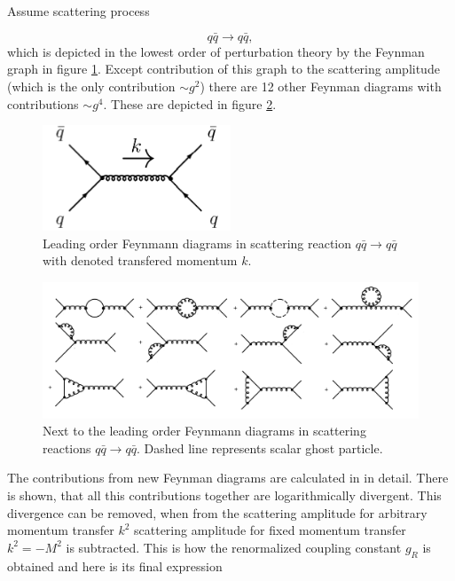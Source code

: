\documentclass[a4paper,11pt]{report}
\begin{document}
Assume scattering process  

\begin{equation}
  q \bar{q} \rightarrow q \bar{q},
  \label{eq:QuarkScattering}
\end{equation}
which is depicted in the lowest order of perturbation theory by the Feynman
graph in figure \ref{fig:QuarkQuarkScattering}. Except contribution of this
graph to the scattering amplitude (which is the only contribution $\sim g^2$)
there are 12 other Feynman diagrams with contributions $\sim g^4$. These are
depicted in figure \ref{fig:QuarkQuarkScatteringCorrection}. 

\begin{figure}[t]
  \centering
  \includegraphics[width=0.5\textwidth]{Chapter1/QuarkQuarkScattering.png} 
  \caption{Leading order Feynmann diagrams in scattering reaction $q \bar{q}
    \rightarrow q \bar{q}$ with denoted transfered momentum $k$.}
  \label{fig:QuarkQuarkScattering}
\end{figure}

\begin{figure}[t]
  \centering
  \includegraphics[width=\textwidth]{Chapter1/QuarkQuarkCorrection.png} 
  \caption{Next to the leading order Feynmann diagrams in scattering reactions
    $q \bar{q} \rightarrow q \bar{q}$. Dashed line represents scalar ghost
  particle.}
  \label{fig:QuarkQuarkScatteringCorrection}
\end{figure}

The contributions from new Feynman diagrams are calculated in \cite{QCDTextbook}
in detail. There is shown, that all this contributions together are
logarithmically divergent. This divergence can be removed, when from the scattering
amplitude for arbitrary momentum transfer $k^2$ scattering amplitude for fixed
momentum transfer $k^2 = -M^2$ is subtracted. This is how the renormalized
coupling constant $g_R$ is obtained and here is its final expression 
\end{document}
